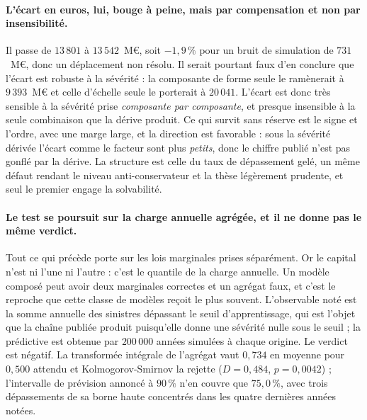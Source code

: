 \paragraph{L'écart en euros, lui, bouge à peine, mais par compensation et non par
insensibilité.} Il passe de $13\,801$ à $13\,542$~M\euro, soit $-1{,}9\,\%$ pour un bruit de
simulation de $731$~M\euro, donc un déplacement non résolu. Il serait pourtant faux d'en conclure
que l'écart est robuste à la sévérité : la composante de forme seule le ramènerait à
$9\,393$~M\euro{} et celle d'échelle seule le porterait à $20\,041$. L'écart est donc très
sensible à la sévérité prise \emph{composante par composante}, et presque insensible à la seule
combinaison que la dérive produit. Ce qui survit sans réserve est le signe et
l'ordre, avec une marge large, et la direction est favorable : sous la sévérité dérivée
l'écart comme le facteur sont plus \emph{petits}, donc le chiffre publié n'est pas gonflé par la
dérive. La structure est celle du taux de dépassement gelé, un même défaut rendant le niveau
anti-conservateur et la thèse légèrement prudente, et seul le premier engage la solvabilité.

\paragraph{Le test se poursuit sur la charge annuelle agrégée, et il ne donne pas le même
verdict.} Tout ce qui précède porte sur les lois marginales prises séparément. Or le capital
n'est ni l'une ni l'autre : c'est le quantile de la charge annuelle. Un modèle composé peut avoir
deux marginales correctes et un agrégat faux, et c'est le reproche que cette classe de modèles
reçoit le plus souvent. L'observable noté est la somme annuelle des sinistres dépassant le seuil
d'apprentissage, qui est l'objet que la chaîne publiée produit puisqu'elle donne une sévérité
nulle sous le seuil ; la prédictive est obtenue par $200\,000$ années simulées à chaque origine.
Le verdict est négatif. La transformée intégrale de l'agrégat vaut $0{,}734$ en moyenne pour
$0{,}500$ attendu et Kolmogorov-Smirnov la rejette ($D = 0{,}484$, $p = 0{,}0042$) ; l'intervalle
de prévision annoncé à $90\,\%$ n'en couvre que $75{,}0\,\%$, avec trois dépassements de sa borne
haute concentrés dans les quatre dernières années notées.


